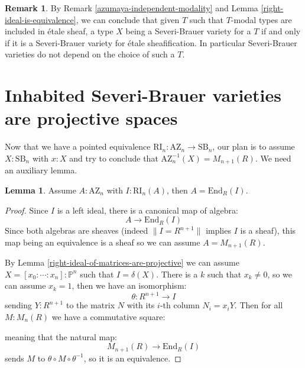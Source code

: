 \documentclass[10pt,a4paper]{article}
\theoremstyle{definition}
\newtheorem{lemma}[theorem]{Lemma}
\newtheorem{remark}[theorem]{Remark}
\newcommand{\SB}{\mathrm{SB}}
\newcommand{\RI}{\mathrm{RI}}
\newcommand{\AZ}{\mathrm{AZ}}
\newcommand{\propTrunc}[1]{\lVert #1 \rVert}
\newcommand{\bP}{\mathbb{P}}
\begin{document}
\begin{remark}\label{severi-brauer-independent-modality}
By Remark \ref{azumaya-independent-modality} and Lemma \ref{right-ideal-is-equivalence}, we can conclude that given $T$ such that $T$-modal types are included in étale sheaf, a type $X$ being a Severi-Brauer variety for a $T$ if and only if it is a Severi-Brauer variety for étale sheafification. In particular Severi-Brauer varieties do not depend on the choice of such a $T$.
\end{remark}


\section{Inhabited Severi-Brauer varieties are projective spaces}

Now that we have a pointed equivalence $\RI_n:\AZ_n \to \SB_n$, our plan is to assume $X:\SB_n$ with $x:X$ and try to conclude that $\AZ_n^{-1}(X) = M_{n+1}(R)$. We need an auxiliary lemma.

\begin{lemma}\label{azumaya-with-right-ideal}
Assume $A:\AZ_n$ with $I:\RI_n(A)$, then $A = \mathrm{End}_R(I)$.
\end{lemma}

\begin{proof}
Since $I$ is a left ideal, there is a canonical map of algebra:
\[A \to\mathrm{End}_R(I)\]
Since both algebras are sheaves (indeed $\propTrunc{I=R^{n+1}}$ implies $I$ is a sheaf), this map being an equivalence is a sheaf so we can assume $A=M_{n+1}(R)$.

By Lemma \ref{right-ideal-of-matrices-are-projective} we can assume $X=[x_0:\cdots:x_n]:\bP^n$ such that $I=\delta(X)$. There is a $k$ such that $x_k\not=0$, so we can assume $x_k=1$, then we have an isomorphism:
\[\theta:R^{n+1}\to I\]
sending $Y:R^{n+1}$ to the matrix $N$ with its $i$-th column $N_i=x_iY$. Then for all $M:M_n(R)$ we have a commutative square:
\begin{center}
\end{center}
meaning that the natural map:
\[ M_{n+1}(R)\to \mathrm{End}_R(I)\]
sends $M$ to $\theta\circ M\circ\theta^{-1}$, so it is an equivalence.
\end{proof}
\end{document}

